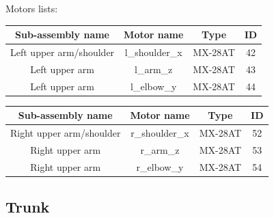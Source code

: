\documentclass{article}
\begin{document}
Motors lists:

\begin{center}

\begin{tabular}{|c|c|c|c|}
\hline 
Sub-assembly name & Motor name & Type & ID \\ 
\hline 

Left upper arm/shoulder & l\_shoulder\_x & MX-28AT & 42 \\ 
\hline 
Left upper arm & l\_arm\_z & MX-28AT & 43 \\
\hline 
Left upper arm & l\_elbow\_y & MX-28AT & 44 \\
\hline 

\end{tabular} 
\end{center}

\begin{center}
\begin{tabular}{|c|c|c|c|}
\hline 
Sub-assembly name & Motor name & Type & ID \\ 
\hline 

Right upper arm/shoulder & r\_shoulder\_x & MX-28AT & 52 \\ 
\hline 
Right upper arm & r\_arm\_z & MX-28AT & 53 \\
\hline 
Right upper arm & r\_elbow\_y & MX-28AT & 54 \\
\hline 

\end{tabular} 
\end{center}


\subsection{Trunk} 
 
\end{document}
